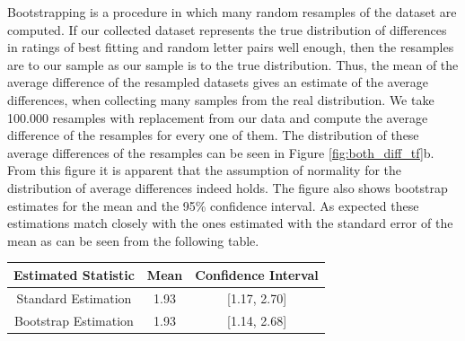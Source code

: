 
Bootstrapping is a procedure in which many random resamples of the dataset are computed. If our collected dataset represents the true distribution of differences in ratings of best fitting and random letter pairs well enough, then the resamples are to our sample as our sample is to the true distribution. Thus, the mean of the average difference of the resampled datasets gives an estimate of the average differences, when collecting many samples from the real distribution. We take 100.000 resamples with replacement from our data and compute the average difference of the resamples for every one of them. The distribution of these average differences of the resamples can be seen in Figure \ref{fig:both_diff_tf}b. From this figure it is apparent that the assumption of normality for the distribution of average differences indeed holds. The figure also shows bootstrap estimates for the mean and the 95\% confidence interval. As expected these estimations match closely with the ones estimated with the standard error of the mean as can be seen from the following table.

\centering
\begin{tabular}[t]{|c||c|c|}
	\hline 
	Estimated Statistic & Mean & Confidence Interval\tabularnewline
	\hline 
	\hline 
	Standard Estimation & 1.93 & [1.17, 2.70]\tabularnewline
	\hline 
	Bootstrap Estimation & 1.93 & [1.14, 2.68]\tabularnewline
	\hline
\end{tabular}

\justifying


